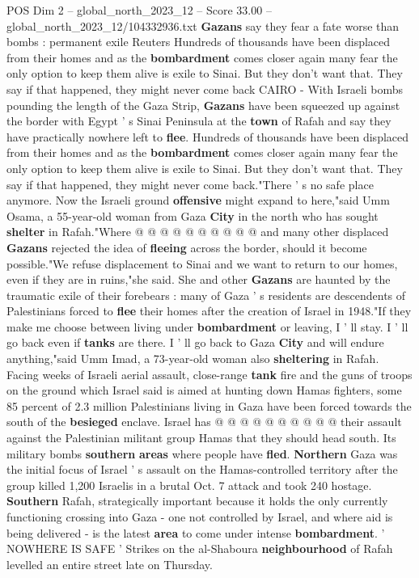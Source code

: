 \begin{textsample}{POS Dim 2 – global\_north\_2023\_12 – Score 33.00 – global\_north\_2023\_12/104332936.txt}  \label{ex:f2_pos_117}
\textbf{Gazans} say they fear a fate worse than bombs : permanent exile Reuters Hundreds of thousands have been displaced from their homes and as the \textbf{bombardment} comes closer again many fear the only option to keep them alive is exile to Sinai.
But they don't want that.
They say if that happened, they might never come back CAIRO - With Israeli bombs pounding the length of the Gaza Strip, \textbf{Gazans} have been squeezed up against the border with Egypt ' s Sinai Peninsula at the \textbf{town} of Rafah and say they have practically nowhere left to \textbf{flee}.
Hundreds of thousands have been displaced from their homes and as the \textbf{bombardment} comes closer again many fear the only option to keep them alive is exile to Sinai.
But they don't want that.
They say if that happened, they might never come back."There ' s no safe place anymore.
Now the Israeli ground \textbf{offensive} might expand to here,"said Umm Osama, a 55-year-old woman from Gaza \textbf{City} in the north who has sought \textbf{shelter} in Rafah."Where @ @ @ @ @ @ @ @ @ @ and many other displaced \textbf{Gazans} rejected the idea of \textbf{fleeing} across the border, should it become possible."We refuse displacement to Sinai and we want to return to our homes, even if they are in ruins,"she said.
She and other \textbf{Gazans} are haunted by the traumatic exile of their forebears : many of Gaza ' s residents are descendents of Palestinians forced to \textbf{flee} their homes after the creation of Israel in 1948."If they make me choose between living under \textbf{bombardment} or leaving, I ' ll stay.
I ' ll go back even if \textbf{tanks} are there.
I ' ll go back to Gaza \textbf{City} and will endure anything,"said Umm Imad, a 73-year-old woman also \textbf{sheltering} in Rafah.
Facing weeks of Israeli aerial assault, close-range \textbf{tank} fire and the guns of troops on the ground which Israel said is aimed at hunting down Hamas fighters, some 85 percent of 2.3 million Palestinians living in Gaza have been forced towards the south of the \textbf{besieged} enclave.
Israel has @ @ @ @ @ @ @ @ @ @ their assault against the Palestinian militant group Hamas that they should head south.
Its military bombs \textbf{southern} \textbf{areas} where people have \textbf{fled}. \textbf{Northern} Gaza was the initial focus of Israel ' s assault on the Hamas-controlled territory after the group killed 1,200 Israelis in a brutal Oct. 7 attack and took 240 hostage. \textbf{Southern} Rafah, strategically important because it holds the only currently functioning crossing into Gaza - one not controlled by Israel, and where aid is being delivered - is the latest \textbf{area} to come under intense \textbf{bombardment}. ' NOWHERE IS SAFE ' Strikes on the al-Shaboura \textbf{neighbourhood} of Rafah levelled an entire street late on Thursday.

\end{textsample}
